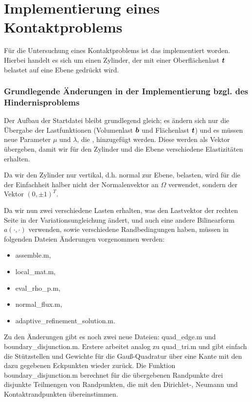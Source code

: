 \section{Implementierung eines Kontaktproblems}
\label{kap:5.2}

Für die Untersuchung eines Kontaktproblems ist das \textit{} implementiert worden. Hierbei handelt es sich um einen Zylinder, der mit einer Oberflächenlast $\boldsymbol t$ belastet auf eine Ebene gedrückt wird.

\subsubsection{Grundlegende Änderungen in der Implementierung bzgl. des Hindernisproblems}

Der Aufbau der Startdatei bleibt grundlegend gleich; es ändern sich nur die Übergabe der Lastfunktionen (Volumenlast $\boldsymbol b$ und Flächenlast $\boldsymbol t$) und es müssen neue Parameter $\mu$ und $\lambda$, die , hinzugefügt werden. Diese werden als Vektor übergeben, damit wir für den Zylinder und die Ebene verschiedene Elastizitäten erhalten.

Da wir den Zylinder nur vertikal, d.h. normal zur Ebene, belasten, wird für die  der Einfachheit halber nicht der Normalenvektor an $\Omega$ verwendet, sondern der Vektor $(0,\pm 1)^T$.

Da wir nun zwei verschiedene Lasten erhalten, was den Lastvektor der rechten Seite in der Variationsungleichung ändert, und auch eine andere Bilinearform $a(\cdot,\cdot)$ verwenden, sowie verschiedene Randbedingungen haben, müssen in folgenden Dateien Änderungen vorgenommen werden:
\begin{itemize}
\item {\ttfamily assemble.m},
\item {\ttfamily local_mat.m},
\item {\ttfamily eval_rho_p.m},
\item {\ttfamily normal_flux.m},
\item {\ttfamily adaptive_refinement_solution.m}.
\end{itemize}

Zu den Änderungen gibt es noch zwei neue Dateien: {\ttfamily quad_edge.m} und {\ttfamily boundary_disjunction.m}. Erstere arbeitet analog zu {\ttfamily quad_tri.m} und gibt einfach die Stützstellen und Gewichte für die Gauß-Quadratur über eine Kante mit den dazu gegebenen Eckpunkten wieder zurück. Die Funktion {\ttfamily boundary_disjunction.m} berechnet für die übergebenen Randpunkte drei disjunkte Teilmengen von Randpunkten, die mit den Dirichlet-, Neumann und Kontaktrandpunkten übereinstimmen.

